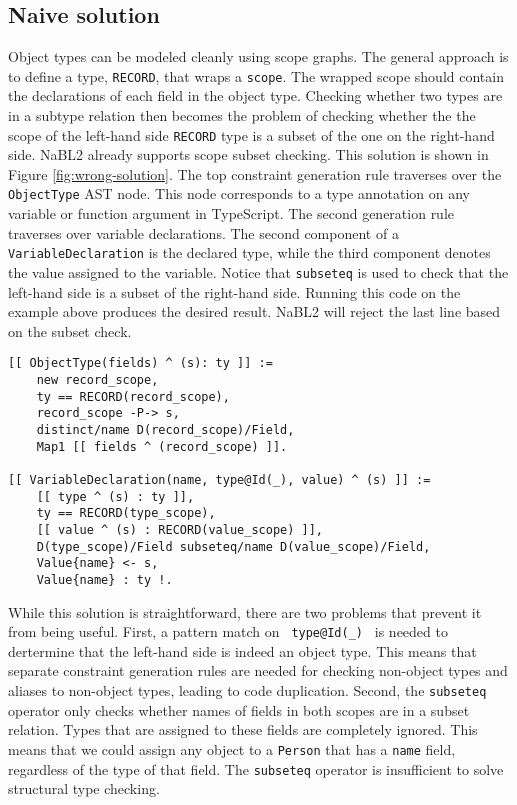 \subsection{Naive solution}
Object types can be modeled cleanly using scope graphs. 
The general approach is to define a type, \texttt{RECORD}, that wraps a \texttt{scope}.
The wrapped scope should contain the declarations of each field in the object type.
Checking whether two types are in a subtype relation then becomes the problem of checking whether
the the scope of the left-hand side \texttt{RECORD} type is a subset of the one on the right-hand side.
NaBL2 already supports scope subset checking.
This solution is shown in Figure \ref{fig:wrong-solution}.
The top constraint generation rule traverses over the \texttt{ObjectType} AST node.
This node corresponds to a type annotation on any variable or function argument in TypeScript.
The second generation rule traverses over variable declarations.
The second component of a \texttt{VariableDeclaration} is the declared type, 
while the third component denotes the value assigned to the variable.
Notice that \texttt{subseteq} is used to check that the left-hand side is a subset of the right-hand side.
Running this code on the example above produces the desired result.
NaBL2 will reject the last line based on the subset check.
\begin{figure*}[h]
\begin{lstlisting}
[[ ObjectType(fields) ^ (s): ty ]] :=
    new record_scope,
    ty == RECORD(record_scope),
    record_scope -P-> s,
    distinct/name D(record_scope)/Field,
    Map1 [[ fields ^ (record_scope) ]].

[[ VariableDeclaration(name, type@Id(_), value) ^ (s) ]] :=
    [[ type ^ (s) : ty ]],
    ty == RECORD(type_scope),
    [[ value ^ (s) : RECORD(value_scope) ]],
    D(type_scope)/Field subseteq/name D(value_scope)/Field,
    Value{name} <- s,
    Value{name} : ty !.
\end{lstlisting}
\caption{Naive solution to object type checking.}
\label{fig:wrong-solution}
\end{figure*}

While this solution is straightforward, there are two problems that prevent it from being useful.
First, a pattern match on \texttt{ type@Id(\_) } is needed to dertermine that the left-hand side is indeed an object type. 
This means that separate constraint generation rules are needed for checking non-object types and aliases to non-object types, leading to code duplication.
Second, the \texttt{subseteq} operator only checks whether names of fields in both scopes are in a subset relation.
Types that are assigned to these fields are completely ignored.
This means that we could assign any object to a \texttt{Person} that has a \texttt{name} field, 
regardless of the type of that field.
The \texttt{subseteq} operator is insufficient to solve structural type checking.

